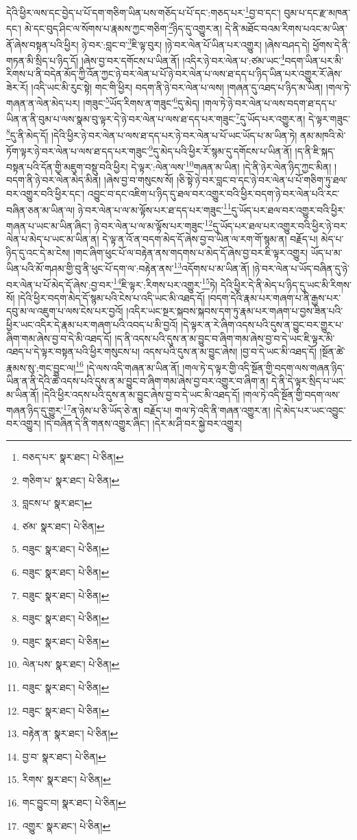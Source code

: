 དེའི་ཕྱིར་ལས་དང་བྱེད་པ་པོ་དག་གཅིག་ཡིན་པས་གཅོད་པ་པོ་དང་:གཅད་པར་\footnote{བཅད་པར་  སྣར་ཐང་།  པེ་ཅིན། }བྱ་བ་དང་། བུམ་པ་དང་རྫ་མཁན་དང་། མེ་དང་བུད་ཤིང་ལ་སོགས་པ་རྣམས་ཀྱང་གཅིག་\footnote{གཅིག་པ་  སྣར་ཐང་།  པེ་ཅིན། }ཉིད་དུ་འགྱུར་ན། དེ་ནི་མཐོང་བའམ་རིགས་པའང་མ་ཡིན་ནོ་ཞེས་བསྟན་པའི་ཕྱིར། ཉེ་བར་:བླང་བ་\footnote{བླངས་པ་  སྣར་ཐང་། }ཇི་ལྟ་བུར། །ཉེ་བར་ལེན་པོ་ཡིན་པར་འགྱུར། །ཞེས་བཤད་དེ། ཕྱོགས་དེ་ནི་གཏན་མི་སྲིད་པ་ཉིད་དོ། །ཞེས་བྱ་བར་དགོངས་པ་ཡིན་ནོ། །འདིར་ཉེ་བར་ལེན་པ་:ཙམ་ཡང་\footnote{ཙམ་  སྣར་ཐང་།  པེ་ཅིན། }བདག་ཡིན་པར་མི་རིགས་པ་ནི་བདེན་མོད་ཀྱི་འོན་ཀྱང་ཉེ་བར་ལེན་པ་པོ་ཉེ་བར་ལེན་པ་ལས་ཐ་དད་པ་ཉིད་ཡིན་པར་འགྱུར་རོ་ཞེས་ཟེར་རོ། །འདི་ཡང་མི་རུང་སྟེ། གང་གི་ཕྱིར། བདག་ནི་ཉེ་བར་ལེན་པ་ལས། །གཞན་དུ་འཐད་པ་ཉིད་མ་ཡིན། །གལ་ཏེ་གཞན་ན་ལེན་མེད་པར། །གཟུང་\footnote{བཟུང་  སྣར་ཐང་།  པེ་ཅིན། }ཡོད་རིགས་ན་གཟུང་\footnote{བཟུང་  སྣར་ཐང་།  པེ་ཅིན། }དུ་མེད། །གལ་ཏེ་ཉེ་བར་ལེན་པ་ལས་བདག་ཐ་དད་པ་ཡིན་ན་ནི་བུམ་པ་ལས་སྣམ་བུ་ལྟར་དེ་ཉེ་བར་ལེན་པ་ལས་ཐ་དད་པར་གཟུང་\footnote{བཟུང་  སྣར་ཐང་།  པེ་ཅིན། }དུ་ཡོད་པར་འགྱུར་ན། དེ་ལྟར་གཟུང་\footnote{བཟུང་  སྣར་ཐང་།  པེ་ཅིན། }དུ་ནི་མེད་དོ། །དེའི་ཕྱིར་ཉེ་བར་ལེན་པ་ལས་ཐ་དད་པར་ཉེ་བར་ལེན་པ་པོ་ཡང་ཡོད་པ་མ་ཡིན་ཏེ། ནམ་མཁའི་མེ་ཏོག་ལྟར་ཉེ་བར་ལེན་པ་ལས་ཐ་དད་པར་གཟུང་\footnote{བཟུང་  སྣར་ཐང་།  པེ་ཅིན། }དུ་མེད་པའི་ཕྱིར་རོ་སྙམ་དུ་དགོངས་པ་ཡིན་ནོ། །ད་ནི་ཇི་སྐད་བསྟན་པའི་དོན་གྱི་མཇུག་བསྡུ་བའི་ཕྱིར། དེ་ལྟར་:ལེན་ལས་\footnote{ལེན་པས་  སྣར་ཐང་།  པེ་ཅིན། }གཞན་མ་ཡིན། །དེ་ནི་ཉེར་ལེན་ཉིད་ཀྱང་མིན། །བདག་ནི་ཉེ་བར་ལེན་མེད་མིན། །ཞེས་བྱ་བ་གསུངས་སོ། །ཅི་སྟེ་ཉེ་བར་བླང་བ་དང་ཉེ་བར་ལེན་པ་པོ་གཅིག་ཏུ་ཐལ་བར་འགྱུར་བའི་ཕྱིར་དང་། འབྱུང་བ་དང་འཇིག་པ་ཉིད་དུ་ཐལ་བར་འགྱུར་བའི་ཕྱིར་བདག་ཉེ་བར་ལེན་པའི་རང་བཞིན་ཅན་མ་ཡིན་ལ། ཉེ་བར་ལེན་པ་ལ་མ་ལྟོས་པར་ཐ་དད་པར་གཟུང་\footnote{བཟུང་  སྣར་ཐང་།  པེ་ཅིན། }དུ་ཡོད་པར་ཐལ་བར་འགྱུར་བའི་ཕྱིར་གཞན་པ་ཡང་མ་ཡིན་ཞིང་། ཉེ་བར་ལེན་པ་ལ་མ་ལྟོས་པར་གཟུང་\footnote{བཟུང་  སྣར་ཐང་།  པེ་ཅིན། }དུ་ཡོད་པར་ཐལ་པར་འགྱུར་བའི་ཕྱིར་ཉེ་བར་ལེན་པ་མེད་པ་ཡང་མ་ཡིན་ན། དེ་ལྟ་ན་འོ་ན་བདག་མེད་དོ་ཞེས་བྱ་བ་ཡིན་ལ་རག་གོ་སྙམ་ན། བརྗོད་པ། མེད་པ་ཉིད་དུ་འང་དེ་མ་ངེས། །གང་ཞིག་ཕུང་པོ་ལ་བརྟེན་ནས་གདགས་པ་མེད་དོ་ཞེས་བྱ་བར་ཇི་ལྟར་འགྱུར། ཡོད་པ་མ་ཡིན་པའི་མོ་གཤམ་གྱི་བུ་ནི་ཕུང་པོ་དག་ལ་:བརྟེན་ནས་\footnote{བརྟེན་ན་  སྣར་ཐང་།  པེ་ཅིན། }འདོགས་པ་མ་ཡིན་ནོ། །ཉེ་བར་ལེན་པ་ཡོད་བཞིན་དུ་ཉེ་བར་ལེན་པ་པོ་མེད་དོ་ཞེས་:བྱ་བར་\footnote{བྱ་བ་  སྣར་ཐང་།  པེ་ཅིན། }ཇི་ལྟར་:རིགས་པར་འགྱུར་\footnote{རིགས་  སྣར་ཐང་།  པེ་ཅིན། }ཏེ། དེའི་ཕྱིར་དེ་ནི་མེད་པ་ཉིད་དུ་ཡང་མི་རིགས་སོ། །དེའི་ཕྱིར་བདག་མེད་དོ་སྙམ་པའི་ངེས་པ་འདི་ཡང་མི་འཐད་དོ། །བདག་དེའི་རྣམ་པར་གཞག་པ་ནི་རྒྱས་པར་དབུ་མ་ལ་འཇུག་པ་ལས་ངེས་པར་བྱའོ། །འདིར་ཡང་སྔར་སྐབས་སྐབས་དག་ཏུ་རྣམ་པར་གཞག་པ་བྱས་ཟིན་པའི་ཕྱིར་ཡང་འདིར་དེ་རྣམ་པར་གཞག་པའི་འབད་པ་མི་བྱའོ། །དེ་ལྟར་ན་རེ་ཞིག་འདས་པའི་དུས་ན་བྱུང་བར་གྱུར་པ་ཞིག་གམ་ཞེས་བྱ་བ་དེ་མི་འཐད་དོ། །ད་ནི་འདས་པའི་དུས་ན་མ་བྱུང་བ་ཞིག་གམ་ཞེས་བྱ་བ་དེ་ཡང་ཇི་ལྟར་མི་འཐད་པ་དེ་ལྟར་བསྟན་པའི་ཕྱིར་གསུངས་པ། འདས་པའི་དུས་ན་མ་བྱུང་ཞེས། །བྱ་བ་དེ་ཡང་མི་འཐད་དོ། །སྔོན་ཚེ་རྣམས་སུ་:གང་བྱུང་ལ།\footnote{གང་བྱུང་བ།  སྣར་ཐང་།  པེ་ཅིན། } །དེ་ལས་འདི་གཞན་མ་ཡིན་ནོ། །གལ་ཏེ་ད་ལྟར་གྱི་འདི་སྔོན་གྱི་བདག་ལས་གཞན་ཉིད་ཡིན་ན་ནི་དེའི་ཚེ་འདས་པའི་དུས་ན་མ་བྱུང་བ་ཞིག་གམ་ཞེས་བྱ་བར་འགྱུར་བ་ཞིག་ན། དེ་ནི་དེ་ལྟར་སྲིད་པ་ཡང་མ་ཡིན་ནོ། །དེའི་ཕྱིར་འདས་པའི་དུས་ན་མ་བྱུང་ཞེས་བྱ་བ་དེ་ཡང་མི་འཐད་དོ། །གལ་ཏེ་འདི་སྔོན་གྱི་བདག་ལས་གཞན་ཉིད་དུ་གྱུར་\footnote{འགྱུར་  སྣར་ཐང་།  པེ་ཅིན། }ན་ཉེས་པ་ཅི་ཡོད་ཅེ་ན། བརྗོད་པ། གལ་ཏེ་འདི་ནི་གཞན་འགྱུར་ན། །དེ་མེད་པར་ཡང་འབྱུང་བར་འགྱུར། །དེ་བཞིན་དེ་ནི་གནས་འགྱུར་ཞིང་། །དེར་མ་ཤི་བར་སྐྱེ་བར་འགྱུར། 